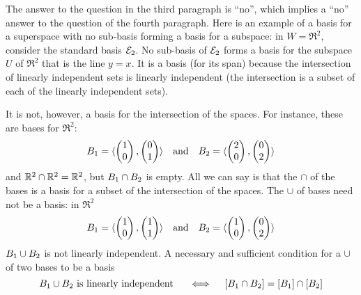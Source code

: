 \begin{exercises}
\begin{answer}
\begin{exparts}
           The answer to the question in the third paragraph is ``no'', which
           implies a ``no'' answer to the question of the fourth paragraph.
           Here is an example of a basis for a superspace with no sub-basis
           forming a basis for a subspace: in \( W=\Re^2 \), consider the
           standard basis \( {\cal E}_2 \).
           No sub-basis of ${\cal E}_2$ forms a basis for the 
           subspace \( U \) 
           of $\Re^2$ that is the line \( y=x \).
         \partsitem It is a basis (for its span) because the
           intersection of linearly
           independent sets is linearly independent (the intersection is a
           subset of each of the linearly independent sets).

           It is not, however, a basis for the intersection of the spaces.
           For instance, these are bases for \( \Re^2 \):
           \begin{equation*}
             B_1=\langle\begin{pmatrix} 1 \\ 0 \end{pmatrix},\begin{pmatrix} 0 \\ 1 \end{pmatrix}\rangle
             \quad\text{and}\quad
             B_2=\langle\begin{pmatrix} 2 \\ 0 \end{pmatrix},\begin{pmatrix} 0 \\ 2 \end{pmatrix}\rangle
           \end{equation*}
           and \( \mathbb{R}^2\cap\mathbb{R}^2=\mathbb{R}^2 \), but
           \( B_1\cap B_2 \) is empty.
           All we can say is that the $\cap$ of the bases is a basis
           for a subset of the intersection of the spaces.
         \partsitem The $\cup$ of bases need not be a basis: in \( \Re^2 \)
           \begin{equation*}
             B_1=\langle\begin{pmatrix} 1 \\ 0 \end{pmatrix},\begin{pmatrix} 1 \\ 1 \end{pmatrix}\rangle
             \quad\text{and}\quad
             B_2=\langle\begin{pmatrix} 1 \\ 0 \end{pmatrix},\begin{pmatrix} 0 \\ 2 \end{pmatrix}\rangle
           \end{equation*}
           \( B_1\cup B_2 \) is not linearly independent.
           A necessary and sufficient condition for a $\cup$ of two bases
           to be a basis 
           \begin{equation*}
             B_1\cup B_2 \text{ is linearly independent }
             \quad\iff\quad
             \relax [B_1\cap B_2\relax ]=\relax [B_1\relax ]\cap
                                            \relax [B_2\relax ]
           \end{equation*}

\end{exparts}
\end{answer}
\end{exercises}

